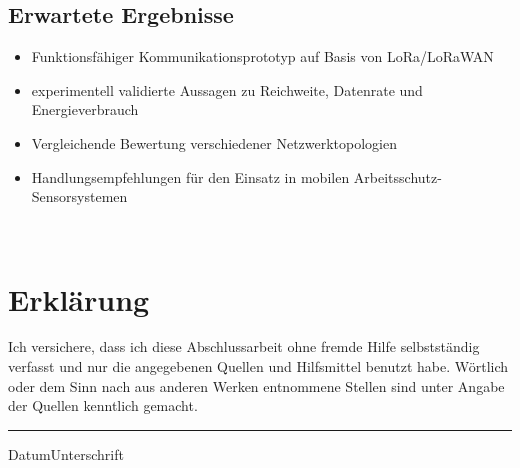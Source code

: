 {      \subsection*{Erwartete Ergebnisse}

      \begin{itemize}[noitemsep]
        \item Funktionsfähiger Kommunikationsprototyp auf Basis von LoRa/LoRaWAN
        \item experimentell validierte Aussagen zu Reichweite, Datenrate und Energieverbrauch
        \item Vergleichende Bewertung verschiedener Netzwerktopologien
        \item Handlungsempfehlungen für den Einsatz in mobilen Arbeitsschutz-Sensorsystemen
      \end{itemize}
      
      \vfill
      \clearpage
      ~
      \newpage
    }
\vspace{10ex}
\section*{Erklärung}
Ich  versichere, dass  ich diese  Abschlussarbeit ohne  fremde  Hilfe selbstständig
verfasst und  nur die  angegebenen Quellen und  Hilfsmittel benutzt  habe. Wörtlich
oder dem  Sinn nach  aus anderen  Werken entnommene Stellen  sind unter  Angabe der
Quellen kenntlich gemacht.
\vspace{10ex}\\

\hrule
{\small{Datum}}\hfill{\small{Unterschrift}}


\tableofcontents
\listoffigures


